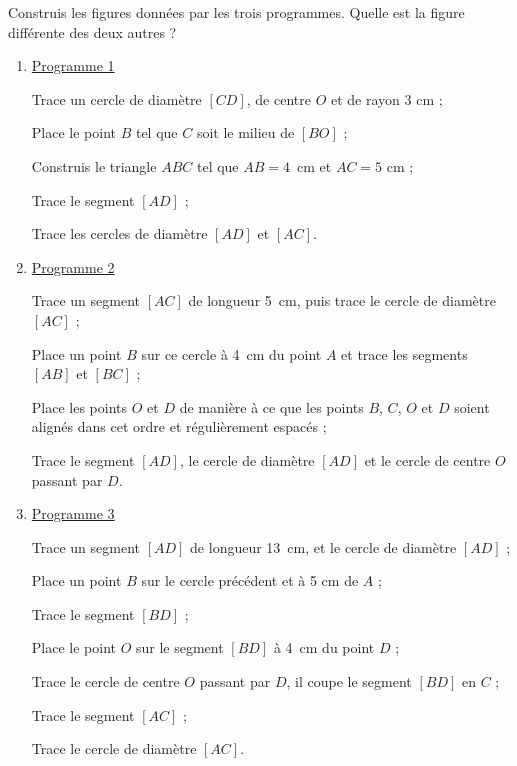 \begin{exercice}[Un intrus]
Construis les figures données par les trois programmes. Quelle est la figure différente des deux autres ?

\begin{enumerate}
 \item \underline{Programme 1}
 
Trace un cercle de diamètre $[CD]$, de centre $O$ et de rayon 3 cm ;

Place le point $B$ tel que $C$ soit le milieu de $[BO]$ ;

Construis le triangle $ABC$ tel que $AB = 4$ cm et $AC = 5$ cm ;

Trace le segment $[AD]$ ;

Trace les cercles de diamètre $[AD]$ et $[AC]$.

 \item \underline{Programme 2}
 
Trace un segment $[AC]$ de longueur 5 cm, puis trace le cercle de diamètre $[AC]$ ;

Place un point $B$ sur ce cercle à 4 cm du point $A$ et trace les segments $[AB]$ et $[BC]$ ;

Place les points $O$ et $D$ de manière à ce que les points $B$, $C$, $O$ et $D$ soient alignés dans cet ordre et régulièrement espacés ;

Trace le segment $[AD]$, le cercle de diamètre $[AD]$ et le cercle de centre $O$ passant par $D$.
 \item \underline{Programme 3}
 
Trace un segment $[AD]$ de longueur 13 cm, et le cercle de diamètre $[AD]$ ;

Place un point $B$ sur le cercle précédent et à 5 cm de $A$ ;

Trace le segment $[BD]$ ;

Place le point $O$ sur le segment $[BD]$ à 4 cm du point $D$ ;

Trace le cercle de centre $O$ passant par $D$, il coupe le segment $[BD]$ en $C$ ;

Trace le segment $[AC]$ ;

Trace le cercle de diamètre $[AC]$.
 \end{enumerate}
\end{exercice}